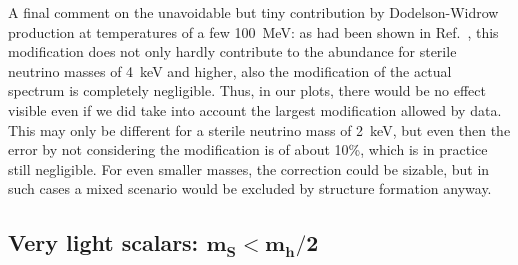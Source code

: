 A final comment on the unavoidable but tiny contribution by Dodelson-Widrow production at temperatures of a few 100~MeV: as had been shown in Ref.~\cite{Merle:2015vzu}, this modification does not only hardly contribute to the abundance for sterile neutrino masses of 4~keV and higher, also the modification of the actual spectrum is completely negligible. Thus, in our plots, there would be no effect visible even if we did take into account the largest modification allowed by data. This may only be different for a sterile neutrino mass of 2~keV, but even then the error by not considering the modification is of about 10\%, which is in practice still negligible. For even smaller masses, the correction could be sizable, but in such cases a mixed scenario would be excluded by structure formation anyway.






\subsection{\label{sec:Results_VeryLight}Very light scalars: $\boldsymbol{m_S < m_h/2}$}

